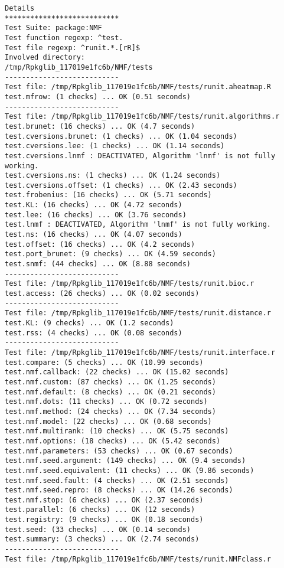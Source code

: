 \documentclass[10pt]{article}\usepackage[]{graphicx}\usepackage[]{color}
\begin{document}
\begin{verbatim}
Details 
*************************** 
Test Suite: package:NMF 
Test function regexp: ^test. 
Test file regexp: ^runit.*.[rR]$ 
Involved directory: 
/tmp/Rpkglib_117019e1fc6b/NMF/tests 
--------------------------- 
Test file: /tmp/Rpkglib_117019e1fc6b/NMF/tests/runit.aheatmap.R 
test.mfrow: (1 checks) ... OK (0.51 seconds)
--------------------------- 
Test file: /tmp/Rpkglib_117019e1fc6b/NMF/tests/runit.algorithms.r 
test.brunet: (16 checks) ... OK (4.7 seconds)
test.cversions.brunet: (1 checks) ... OK (1.04 seconds)
test.cversions.lee: (1 checks) ... OK (1.14 seconds)
test.cversions.lnmf : DEACTIVATED, Algorithm 'lnmf' is not fully working.
test.cversions.ns: (1 checks) ... OK (1.24 seconds)
test.cversions.offset: (1 checks) ... OK (2.43 seconds)
test.frobenius: (16 checks) ... OK (5.71 seconds)
test.KL: (16 checks) ... OK (4.72 seconds)
test.lee: (16 checks) ... OK (3.76 seconds)
test.lnmf : DEACTIVATED, Algorithm 'lnmf' is not fully working.
test.ns: (16 checks) ... OK (4.07 seconds)
test.offset: (16 checks) ... OK (4.2 seconds)
test.port_brunet: (9 checks) ... OK (4.59 seconds)
test.snmf: (44 checks) ... OK (8.88 seconds)
--------------------------- 
Test file: /tmp/Rpkglib_117019e1fc6b/NMF/tests/runit.bioc.r 
test.access: (26 checks) ... OK (0.02 seconds)
--------------------------- 
Test file: /tmp/Rpkglib_117019e1fc6b/NMF/tests/runit.distance.r 
test.KL: (9 checks) ... OK (1.2 seconds)
test.rss: (4 checks) ... OK (0.08 seconds)
--------------------------- 
Test file: /tmp/Rpkglib_117019e1fc6b/NMF/tests/runit.interface.r 
test.compare: (5 checks) ... OK (10.99 seconds)
test.nmf.callback: (22 checks) ... OK (15.02 seconds)
test.nmf.custom: (87 checks) ... OK (1.25 seconds)
test.nmf.default: (8 checks) ... OK (0.21 seconds)
test.nmf.dots: (11 checks) ... OK (0.72 seconds)
test.nmf.method: (24 checks) ... OK (7.34 seconds)
test.nmf.model: (22 checks) ... OK (0.68 seconds)
test.nmf.multirank: (10 checks) ... OK (5.75 seconds)
test.nmf.options: (18 checks) ... OK (5.42 seconds)
test.nmf.parameters: (53 checks) ... OK (0.67 seconds)
test.nmf.seed.argument: (149 checks) ... OK (9.4 seconds)
test.nmf.seed.equivalent: (11 checks) ... OK (9.86 seconds)
test.nmf.seed.fault: (4 checks) ... OK (2.51 seconds)
test.nmf.seed.repro: (8 checks) ... OK (14.26 seconds)
test.nmf.stop: (6 checks) ... OK (2.37 seconds)
test.parallel: (6 checks) ... OK (12 seconds)
test.registry: (9 checks) ... OK (0.18 seconds)
test.seed: (33 checks) ... OK (0.14 seconds)
test.summary: (3 checks) ... OK (2.74 seconds)
--------------------------- 
Test file: /tmp/Rpkglib_117019e1fc6b/NMF/tests/runit.NMFclass.r 

\end{verbatim}
\end{document}
